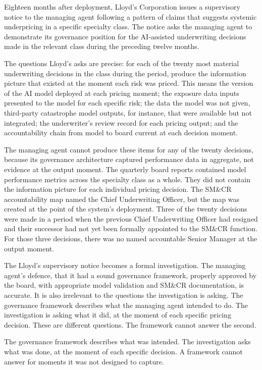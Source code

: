 Eighteen months after deployment, Lloyd's Corporation issues a supervisory notice to the managing agent following a pattern of claims that suggests systemic underpricing in a specific specialty class. The notice asks the managing agent to demonstrate its governance position for the AI-assisted underwriting decisions made in the relevant class during the preceding twelve months.

The questions Lloyd's asks are precise: for each of the twenty most material underwriting decisions in the class during the period, produce the information picture that existed at the moment each risk was priced. This means the version of the AI model deployed at each pricing moment; the exposure data inputs presented to the model for each specific risk; the data the model was not given, third-party catastrophe model outputs, for instance, that were available but not integrated; the underwriter's review record for each pricing output; and the accountability chain from model to board current at each decision moment.

The managing agent cannot produce these items for any of the twenty decisions, because its governance architecture captured performance data in aggregate, not evidence at the output moment. The quarterly board reports contained model performance metrics across the specialty class as a whole. They did not contain the information picture for each individual pricing decision. The SM\&CR accountability map named the Chief Underwriting Officer, but the map was created at the point of the system's deployment. Three of the twenty decisions were made in a period when the previous Chief Underwriting Officer had resigned and their successor had not yet been formally appointed to the SM\&CR function. For those three decisions, there was no named accountable Senior Manager at the output moment.

The Lloyd's supervisory notice becomes a formal investigation. The managing agent's defence, that it had a sound governance framework, properly approved by the board, with appropriate model validation and SM\&CR documentation, is accurate. It is also irrelevant to the questions the investigation is asking. The governance framework describes what the managing agent intended to do. The investigation is asking what it did, at the moment of each specific pricing decision. These are different questions. The framework cannot answer the second.

The governance framework describes what was intended. The investigation asks what was done, at the moment of each specific decision. A framework cannot answer for moments it was not designed to capture.

